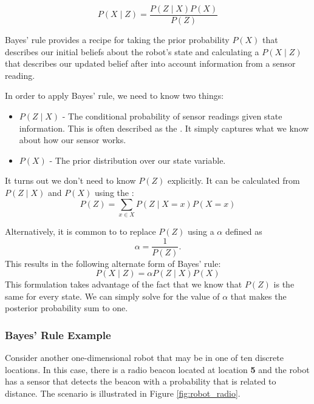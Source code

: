 \begin{equation}
  P(X \mid Z) =  \frac{P(Z \mid X) P(X)}{P(Z)}
\end{equation}

Bayes' rule provides a recipe for taking the prior probability $P(X)$
that describes our initial beliefs about the robot's state and
calculating a  $P(X \mid Z)$ that
describes our updated belief after into account information from a
sensor reading.

In order to apply Bayes' rule, we need to know two things:

\begin{itemize}
  \item $P(Z \mid X)$ - The conditional probability of sensor readings
    given state information.  This is often described as the
    . It simply captures what we know about
    how our sensor works.
    \item $P(X)$ - The prior distribution over our state variable. 
\end{itemize}
It turns out we don't need to know $P(Z)$ explicitly.  It can be
calculated from $P(Z \mid X)$ and $P(X)$ using the :
\begin{equation}\label{eq:total}
  P(Z) = \sum_{x \in X} P(Z \mid X=x) P(X=x)
\end{equation}


Alternatively, it is common to to replace $P(Z)$ using a
 $\alpha$ defined as
\[\alpha = \frac{1}{P(Z)}.\] This results in the following alternate form of Bayes' rule:
\begin{equation}
  P(X \mid Z) = \alpha P(Z \mid X) P(X)
\end{equation}
This formulation takes advantage of the fact that we know that $P(Z)$
is the same for every state. We can simply solve for the value of
$\alpha$ that makes the posterior probability sum to one.

\subsubsection{Bayes' Rule Example}

Consider another one-dimensional robot that may be in
one of ten discrete locations.  In this case, there is a radio beacon
located at location \textbf{5} and the robot has a sensor that detects
the beacon with a probability that is related to distance.  The
scenario is illustrated in Figure \ref{fig:robot_radio}.


